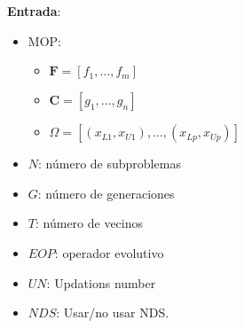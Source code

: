 \begin{minipage}[H]{0.47\linewidth}
    \begin{algorithm}[H]
\SetAlgoLined
 \textbf{Entrada}:
 \begin{itemize}
 
     \vspace{0.15cm}\item MOP: 
     \begin{itemize}
         \vspace{0.15cm}\item[] $\boldsymbol{F}=[f_1, \dots, f_m]$
         \vspace{0.15cm}\item[] $\boldsymbol{C} =[g_1, \dots, g_n]$
         \vspace{0.15cm}\item[] $\Omega =[(x_{L1}, x_{U1}), \dots, (x_{Lp}, x_{Up})]$
     \end{itemize}
     
    \vspace{0.15cm}\item $N$: número de subproblemas
     
    \vspace{0.15cm}\item $G$: número de generaciones
     
    \vspace{0.15cm}\item $T$: número de vecinos

    \vspace{0.15cm}\item $EOP$: operador evolutivo

    \vspace{0.15cm}\item $UN$: Updations number

    \vspace{0.15cm}\item $NDS$: Usar/no usar NDS.

 \end{itemize}
 
 \vspace{0.3cm}
  

\end{algorithm}
\end{minipage}

